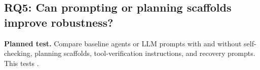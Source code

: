 

\subsection{RQ5: Can prompting or planning scaffolds improve robustness?}
\textbf{Planned test.} Compare baseline agents or LLM prompts with and without self-checking, planning scaffolds, tool-verification instructions, and recovery prompts. This tests .


